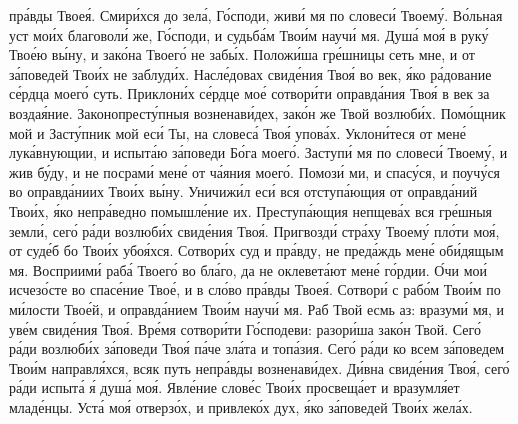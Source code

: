 \begin{mymulticols}
пр\'{а}вды Твое\'{я}. Смир\'{и}хся до зел\'{а}, Г\'{о}споди, жив\'{и} мя по словес\'{и} Твоем\'{у}. В\'{о}льная уст мо\'{и}х благовол\'{и} же, Г\'{о}споди, и судьб\'{а}м Тво\'{и}м науч\'{и} мя. Душ\'{а} мо\'{я} в рук\'{у} Тво\'{е}ю в\'{ы}ну, и зак\'{о}на Твоег\'{о} не заб\'{ы}х. Полож\'{и}ша гр\'{е}шницы сеть мне, и от з\'{а}поведей Тво\'{и}х не заблуд\'{и}х. Насл\'{е}довах свид\'{е}ния Тво\'{я} во век, \'{я}ко р\'{а}дование с\'{е}рдца моег\'{о} суть. Приклон\'{и}х с\'{е}рдце мо\'{е} сотвор\'{и}ти оправд\'{а}ния Тво\'{я} в век за возда\'{я}ние. Законопрест\'{у}пныя возненав\'{и}дех, зак\'{о}н же Твой возлюб\'{и}х. Пом\'{о}щник мой и Заст\'{у}пник мой ес\'{и} Ты, на словес\'{а} Тво\'{я} упов\'{а}х. Уклон\'{и}теся от мен\'{е} лук\'{а}внующии, и испыт\'{а}ю з\'{а}поведи Б\'{о}га моег\'{о}. Заступ\'{и} мя по словес\'{и} Твоем\'{у}, и жив б\'{у}ду, и не посрам\'{и} мен\'{е} от ч\'{а}яния моег\'{о}. Помоз\'{и} ми, и спас\'{у}ся, и поуч\'{у}ся во оправд\'{а}ниих Тво\'{и}х в\'{ы}ну. Уничиж\'{и}л ес\'{и} вся отступ\'{а}ющия от оправд\'{а}ний Тво\'{и}х, \'{я}ко непр\'{а}ведно помышл\'{е}ние их. Преступ\'{а}ющия непщев\'{а}х вся гр\'{е}шныя земл\'{и}, сег\'{о} р\'{а}ди возлюб\'{и}х свид\'{е}ния Тво\'{я}. Пригвозд\'{и} стр\'{а}ху Твоем\'{у} пл\'{о}ти мо\'{я}, от суд\'{е}б бо Тво\'{и}х убо\'{я}хся. Сотвор\'{и}х суд и пр\'{а}вду, не пред\'{а}ждь мен\'{е} об\'{и}дящым мя. Восприим\'{и} раб\'{а} Твоег\'{о} во бл\'{а}го, да не оклевет\'{а}ют мен\'{е} г\'{о}рдии. \'{О}чи мо\'{и} исчез\'{о}сте во спас\'{е}ние Тво\'{е}, и в сл\'{о}во пр\'{а}вды Твое\'{я}. Сотвор\'{и} с раб\'{о}м Тво\'{и}м по м\'{и}лости Тво\'{е}й, и оправд\'{а}нием Тво\'{и}м науч\'{и} мя. Раб Твой есмь аз: вразум\'{и} мя, и ув\'{е}м свид\'{е}ния Тво\'{я}. Вр\'{е}мя сотвор\'{и}ти Г\'{о}сподеви: разор\'{и}ша зак\'{о}н Твой. Сег\'{о} р\'{а}ди возлюб\'{и}х з\'{а}поведи Тво\'{я} п\'{а}че зл\'{а}та и топ\'{а}зия. Сег\'{о} р\'{а}ди ко всем з\'{а}поведем Тво\'{и}м направл\'{я}хся, всяк путь непр\'{а}вды возненав\'{и}дех. Д\'{и}вна свид\'{е}ния Тво\'{я}, сег\'{о} р\'{а}ди испыт\'{а} \'{я} душ\'{а} мо\'{я}. Явл\'{е}ние слов\'{е}с Тво\'{и}х просвещ\'{а}ет и вразумл\'{я}ет млад\'{е}нцы. Уст\'{а} мо\'{я} отверз\'{о}х, и привлек\'{о}х дух, \'{я}ко з\'{а}поведей Тво\'{и}х жел\'{а}х.

\pominalnayaslava


\end{mymulticols}
